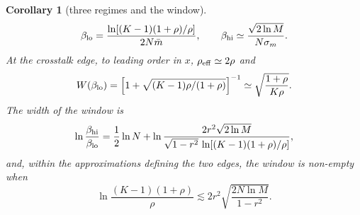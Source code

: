 \documentclass[11pt,a4paper]{article}
\newtheorem{corollary}{Corollary}
\begin{document}
\begin{corollary}[three regimes and the window]
\begin{equation}
\beta_{\rm lo}=\frac{\ln[(K-1)(1+\rho)/\rho]}{2N\bar m},\qquad \beta_{\rm hi}\simeq\frac{\sqrt{2\ln M}}{N\sigma_m}.
\label{eq:window_emp}
\end{equation}
At the crosstalk edge, to leading order in $x$, $\rho_{\rm eff}\simeq2\rho$ and
\begin{equation*}
W(\beta_{\rm lo})=\Big[1+\sqrt{(K-1)\rho/(1+\rho)}\Big]^{-1}\simeq\sqrt{\frac{1+\rho}{K\rho}}.
\end{equation*}
The width of the window is
\begin{equation*}
\ln\frac{\beta_{\rm hi}}{\beta_{\rm lo}}=\frac12\ln N+\ln\frac{2r^2\sqrt{2\ln M}}{\sqrt{1-r^2}\,\ln[(K-1)(1+\rho)/\rho]},
\end{equation*}
and, within the approximations defining the two edges, the window is non-empty when
\begin{equation}
\ln\frac{(K-1)(1+\rho)}{\rho}\lesssim 2r^2\sqrt{\frac{2N\ln M}{1-r^2}}.
\label{eq:Kmax}
\end{equation}
\end{corollary}
\end{document}
